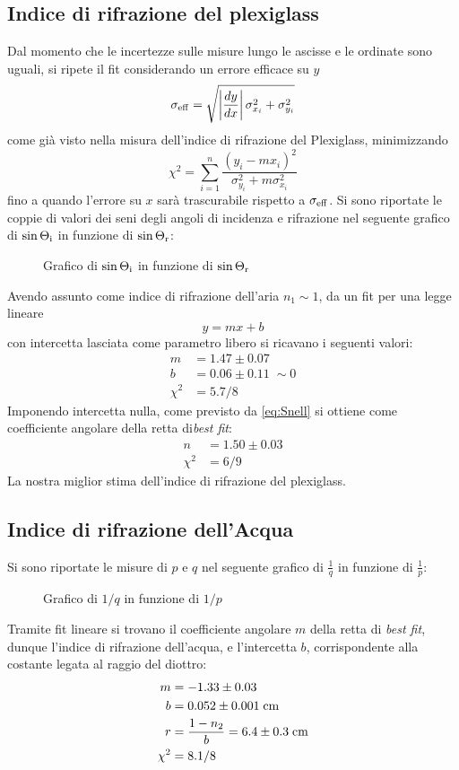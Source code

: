\documentclass{article}[a4paper,11pt]
\begin{document}
\subsection*{Indice di rifrazione del plexiglass}
Dal momento che le incertezze sulle misure lungo le ascisse e le ordinate sono uguali, si ripete il fit considerando un errore efficace su $y$ 
\begin{equation*}
\sigma_{\rm eff} = \sqrt{\left|\frac{dy}{dx}\right|\sigma_{x_i}^2 + \sigma_{y_i}^2}
\end{equation*}
come già visto nella misura dell'indice di rifrazione del Plexiglass, minimizzando 
\begin{equation}\label{eq:chi_eff}
\chi^2 = \sum_{i=1}^{n} \frac{(y_i-mx_i)^2}{\sigma_{y_i}^2 + m\sigma_{x_i}^2}
\end{equation}
fino a quando l'errore su $x$ sarà trascurabile rispetto a $\sigma_{\rm eff}$.
Si sono riportate le coppie di valori dei seni degli angoli di incidenza e rifrazione nel seguente grafico di $\sin\Theta_{\rm i}$ in funzione di $\sin\Theta_{\rm r}$:
\begin{figure}[!htb]
  \centering
    \scalebox{0.8}{}
  \caption{Grafico di $\sin\Theta_{\rm i}$ in funzione di $\sin\Theta_{\rm r}$\label{graph: plex}}
\end{figure}
Avendo assunto come indice di rifrazione dell'aria $n_1 \sim 1$, da un fit per una legge lineare $$y=mx + b$$ con intercetta lasciata come parametro libero si ricavano i seguenti valori:
\begin{align*}
m &= 1.47 \pm 0.07 \\
b &= 0.06 \pm 0.11 \; \sim 0 \\
\chi^2 &= 5.7/8
\end{align*}
Imponendo intercetta nulla, come previsto da \eqref{eq:Snell} si ottiene come coefficiente angolare della retta di\emph{best fit}:
\begin{align*}
n &= 1.50 \pm 0.03 \\
\chi^2 &= 6/9
\end{align*}
La nostra miglior stima dell'indice di rifrazione del plexiglass.
\subsection*{Indice di rifrazione dell'Acqua}
Si sono riportate le misure di $p$ e $q$ nel seguente grafico di $\frac{1}{q}$ in funzione di $\frac{1}{p}$:
\begin{figure}[!htb]
  \centering
    \scalebox{0.8}{}
  \caption{Grafico di $1/q$ in funzione di $1/p$\label{graph: water}}
\end{figure}
\noindent
Tramite fit lineare si trovano il coefficiente angolare $m$ della retta di \emph{best fit}, dunque l'indice di rifrazione dell'acqua, e l'intercetta $b$, corrispondente alla costante legata al raggio del diottro:
\begin{align*}
m &= -1.33 \pm 0.03 \\
b &= 0.052 \pm 0.001 \; \si{\/\cm} \\
r &= \frac{1-n_2}{b} = 6.4 \pm 0.3 \; \si{\cm}\\
\chi^2 &= 8.1/8
\end{align*}
\end{document}

